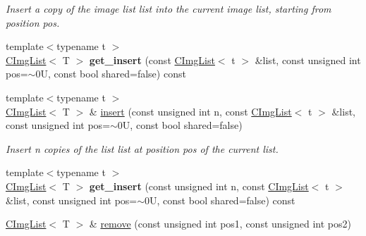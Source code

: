 \begin{DoxyCompactItemize}
\begin{DoxyCompactList}\small\item\em Insert a copy of the image list {\ttfamily list} into the current image list, starting from position {\ttfamily pos}. \item\end{DoxyCompactList}\item 
\hypertarget{structcimg__library_1_1CImgList_a4813df33fcfca0d02eaddb2653c3057c}{
{\footnotesize template$<$typename t $>$ }\\\hyperlink{structcimg__library_1_1CImgList}{CImgList}$<$ T $>$ {\bfseries get\_\-insert} (const \hyperlink{structcimg__library_1_1CImgList}{CImgList}$<$ t $>$ \&list, const unsigned int pos=$\sim$0U, const bool shared=false) const }
\label{structcimg__library_1_1CImgList_a4813df33fcfca0d02eaddb2653c3057c}

\item 
\hypertarget{structcimg__library_1_1CImgList_af0bd9ec2232e6bb103c11ac2d1685413}{
{\footnotesize template$<$typename t $>$ }\\\hyperlink{structcimg__library_1_1CImgList}{CImgList}$<$ T $>$ \& \hyperlink{structcimg__library_1_1CImgList_af0bd9ec2232e6bb103c11ac2d1685413}{insert} (const unsigned int n, const \hyperlink{structcimg__library_1_1CImgList}{CImgList}$<$ t $>$ \&list, const unsigned int pos=$\sim$0U, const bool shared=false)}
\label{structcimg__library_1_1CImgList_af0bd9ec2232e6bb103c11ac2d1685413}

\begin{DoxyCompactList}\small\item\em Insert n copies of the list {\ttfamily list} at position {\ttfamily pos} of the current list. \item\end{DoxyCompactList}\item 
\hypertarget{structcimg__library_1_1CImgList_abf68a2890412c4e1d9202b15917aef59}{
{\footnotesize template$<$typename t $>$ }\\\hyperlink{structcimg__library_1_1CImgList}{CImgList}$<$ T $>$ {\bfseries get\_\-insert} (const unsigned int n, const \hyperlink{structcimg__library_1_1CImgList}{CImgList}$<$ t $>$ \&list, const unsigned int pos=$\sim$0U, const bool shared=false) const }
\label{structcimg__library_1_1CImgList_abf68a2890412c4e1d9202b15917aef59}

\item 
\hypertarget{structcimg__library_1_1CImgList_a2116e4ad3f06244c088451bfc7069474}{
\hyperlink{structcimg__library_1_1CImgList}{CImgList}$<$ T $>$ \& \hyperlink{structcimg__library_1_1CImgList_a2116e4ad3f06244c088451bfc7069474}{remove} (const unsigned int pos1, const unsigned int pos2)}
\label{structcimg__library_1_1CImgList_a2116e4ad3f06244c088451bfc7069474}


\end{DoxyCompactItemize}
